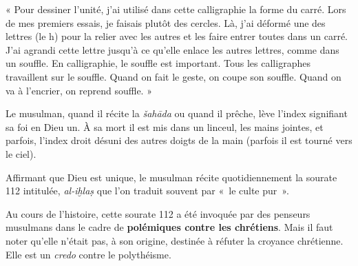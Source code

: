 « Pour dessiner l'unité, j'ai utilisé dans cette calligraphie la forme
du carré. Lors de mes premiers essais, je faisais plutôt des cercles.
Là, j'ai déformé une des lettres (le h) pour la relier avec les autres
et les faire entrer toutes dans un carré. J'ai agrandi cette lettre
jusqu'à ce qu'elle enlace les autres lettres, comme dans un souffle. En
calligraphie, le souffle est important. Tous les calligraphes
travaillent sur le souffle. Quand on fait le geste, on coupe son
souffle. Quand on va à l'encrier, on reprend souffle. » 



Le musulman, quand il récite la \emph{šahāda} ou quand il prêche, lève
l'index signifiant sa foi en Dieu un. À sa mort il est mis dans un
linceul, les mains jointes, et parfois, l'index droit désuni des autres
doigts de la main (parfois il est tourné vers le ciel).




Affirmant que Dieu est unique, le musulman récite quotidiennement la
sourate 112 intitulée, \emph{al-iḫlaṣ} que l'on traduit souvent par «~le
culte pur~».


\begin{table}[h!]
\caption{sourate 112 , \emph{al-iḫlaṣ}, «~le
culte pur~»}
\end{table}



Au cours de l'histoire, cette sourate 112 a été invoquée par des
penseurs musulmans dans le cadre de \textbf{polémiques contre les
chrétiens}. Mais il faut noter qu'elle n'était pas, à son origine,
destinée à réfuter la croyance chrétienne. Elle est un \emph{credo}
contre le polythéisme.

